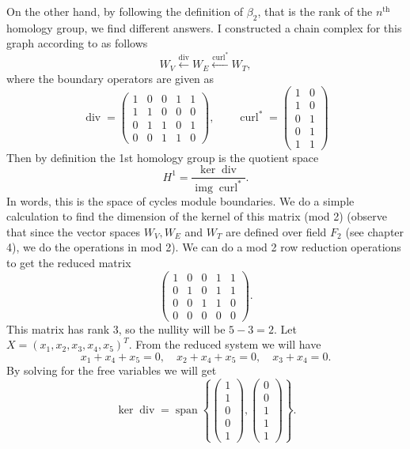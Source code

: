 \documentclass[11pt,a4paper]{article}
\newcommand{\curl}{\operatorname{curl}}
\renewcommand{\div}{\operatorname{div}}
\newcommand{\img}{\operatorname{img}}
\begin{document}
	On the other hand, by following the definition of $ \beta_2 $, that is the rank of the $ n^\text{th} $ homology group, we find different answers. I constructed a chain complex for this graph according to \cite{Lim2019} as follows
	\[ W_V \xleftarrow{\div} W_E \xleftarrow{\curl^*} W_T,  \tag{1} \]
	where the boundary operators are given as
	\[ \div = \begin{pmatrix}
		1 & 0 & 0 & 1 & 1 \\
		1 & 1 & 0 & 0 & 0 \\
		0 & 1 & 1 & 0 & 1 \\
		0 & 0 & 1 & 1 & 0
	\end{pmatrix}, \qquad
	\curl^* = \begin{pmatrix}
		1 & 0 \\
		1 & 0 \\
		0 & 1 \\
		0 & 1 \\
		1 & 1 
	\end{pmatrix} \]
	Then by definition the 1st homology group is the quotient space
	\[ H^1 = \frac{\ker \div }{\img \curl^*}. \]
	In words, this is the space of cycles module boundaries. We do a simple calculation to find the dimension of the kernel of this matrix (mod 2) (observe that since the vector spaces $ W_V, W_E $ and $ W_T $ are defined over field $ F_2 $ (see \cite{Gross2005} chapter 4), we do the operations in mod 2). We can do a mod 2 row reduction operations to get the reduced matrix
	\[ \begin{pmatrix}
		1 & 0 & 0 & 1 & 1 \\
		0 & 1 & 0 & 1 & 1 \\
		0 & 0 & 1 & 1 & 0 \\
		0 & 0 & 0 & 0 & 0
	\end{pmatrix}. \]
	This matrix has rank 3, so the nullity will be $ 5 - 3 = 2 $. Let $ X = (x_1,x_2,x_3,x_4,x_5)^T $. From the reduced system we will have
	\[ x_1 + x_4 + x_5 = 0, \quad x_2 + x_4 + x_5 = 0, \quad x_3 + x_4 = 0. \]
	By solving for the free variables we will get 
	\[
	\ker \div = \operatorname{span} \left\{
	\begin{pmatrix}
		1 \\ 1 \\ 0 \\ 0 \\ 1
	\end{pmatrix},
	\begin{pmatrix}
		0 \\ 0 \\ 1 \\ 1 \\ 1
	\end{pmatrix}
	\right\}.
	\]
	
\end{document}
